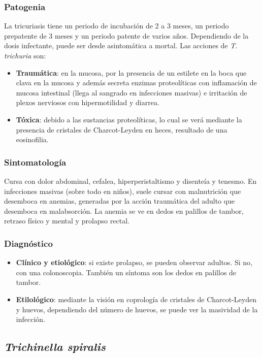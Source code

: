 \subsubsection{Patogenia}
La tricuriasis tiene un periodo de incubación de 2 a 3 meses, un periodo prepatente de 3 meses y un periodo patente de varios años. Dependiendo de la dosis infectante, puede ser desde asintomática a mortal. Las acciones de \textit{T. trichuria} son:
\begin{itemize}[itemsep=0pt,parsep=0pt,topsep=0pt,partopsep=0pt]
	\item\textbf{Traumática}: en la mucosa, por la presencia de un estilete en la boca que clava en la mucosa y además secreta enzimas proteolíticas con inflamación de mucosa intestinal (llega al sangrado en infecciones masivas) e irritación de plexos nerviosos con hipermotilidad y diarrea.
	\item \textbf{Tóxica}: debido a las sustancias proteolíticas, lo cual se verá mediante la presencia de cristales de Charcot-Leyden en heces, resultado de una eosinofilia.
\end{itemize}
\subsubsection{Sintomatología}
Cursa con dolor abdominal, cefalea, hiperperistaltismo y disenteía y tenesmo. En infecciones masivas (sobre todo en niños), suele cursar con malnutrición que desemboca en anemias, generadas por la acción traumática del adulto que desemboca en malabsorción. La anemia se ve en dedos en palillos de tambor, retraso físico y mental y prolapso rectal.
\subsubsection{Diagnóstico}
\begin{itemize}[itemsep=0pt,parsep=0pt,topsep=0pt,partopsep=0pt]
	\item \textbf{Clínico y etiológico}: si existe prolapso, se pueden observar adultos. Si no, con una colonoscopia. También un síntoma son los dedos en palillos de tambor.
	\item \textbf{Etilológico}: mediante la visión en coprología de cristales de Charcot-Leyden y huevos, dependiendo del número de huevos, se puede ver la masividad de la infección.
\end{itemize}
\newpage
\subsection{\textit{Trichinella spiralis}}
\newpage
